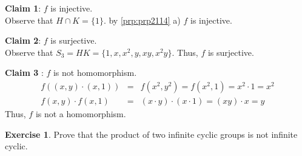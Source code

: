 \documentclass[
]{book}
\theoremstyle{definition}
\theoremstyle{definition}
\theoremstyle{definition}
\newtheorem{exercise}{Exercise}[chapter]
\theoremstyle{definition}
\theoremstyle{remark}
\begin{document}
\textbf{Claim 1}: \(f\) is injective.\\
Observe that \(H \cap K=\{1\}\). by \ref{prp:prp2114} a) \(f\) is injective.

\textbf{Claim 2}: \(f\) is surjective.\\
Observe that \(S_3=HK=\{1,x,x^2,y,xy,x^2y\}\). Thus, \(f\) is surjective.

\textbf{Claim 3} : \(f\) is not homomorphism.\\
\begin{eqnarray}
f((x,y)\cdot (x,1))&=& f(x^2,y^2)=f(x^2,1)=x^2\cdot 1=x^2\\
f(x,y)\cdot f(x,1)&=& (x\cdot y)\cdot (x\cdot 1)=(xy)\cdot x=y
\end{eqnarray}
Thus, \(f\) is not a homomorphism.

\begin{exercise}
\protect\hypertarget{exr:unnamed-chunk-149}{}\label{exr:unnamed-chunk-149}Prove that the product of two infinite cyclic groups is not infinite cyclic.
\end{exercise}
\end{document}
